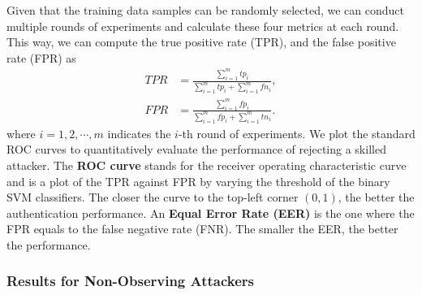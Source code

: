 Given that the training data samples can be randomly selected, we can conduct multiple rounds of experiments and calculate these four metrics at each round. This way, we can compute the true positive rate (TPR), and the false positive rate (FPR) as
\begin{align}
\nonumber TPR &= \frac{\sum_{i=1}^m tp_i}{\sum_{i=1}^m tp_i+\sum_{i=1}^m fn_i}, \\
\nonumber FPR &= \frac{\sum_{i=1}^m fp_i}{\sum_{i=1}^m fp_i+\sum_{i=1}^m tn_i}.
\end{align}
where $i=1,2,\cdots, m$ indicates the $i$-th round of experiments. We plot the standard ROC curves to quantitatively evaluate the performance of rejecting a skilled attacker. The \textbf{ROC curve} stands for the receiver operating characteristic curve and is a plot of the TPR against FPR by varying the threshold of the binary SVM classifiers. The closer the curve to the top-left corner $(0, 1)$, the better the authentication performance. An \textbf{Equal Error Rate (EER)} is the one where the FPR equals to the false negative rate (FNR). The smaller the EER, the better the performance.



%
% 




 
\subsubsection{Results for Non-Observing Attackers}
\label{sec:para}

